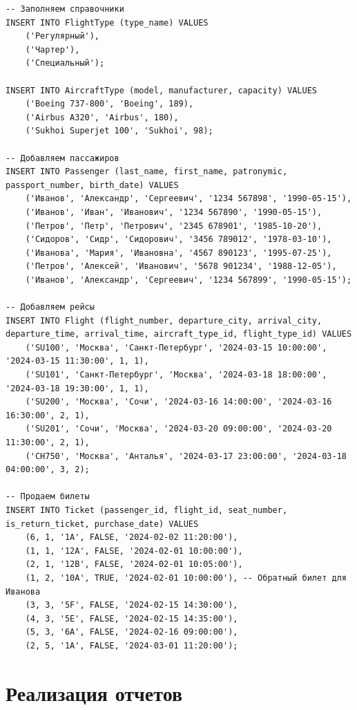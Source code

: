 \documentclass[a4paper,12pt]{article}
\begin{document}
\begin{verbatim}
-- Заполняем справочники
INSERT INTO FlightType (type_name) VALUES 
    ('Регулярный'),
    ('Чартер'),
    ('Специальный');

INSERT INTO AircraftType (model, manufacturer, capacity) VALUES 
    ('Boeing 737-800', 'Boeing', 189),
    ('Airbus A320', 'Airbus', 180),
    ('Sukhoi Superjet 100', 'Sukhoi', 98);

-- Добавляем пассажиров
INSERT INTO Passenger (last_name, first_name, patronymic, passport_number, birth_date) VALUES
	('Иванов', 'Александр', 'Сергеевич', '1234 567898', '1990-05-15'),
    ('Иванов', 'Иван', 'Иванович', '1234 567890', '1990-05-15'),
    ('Петров', 'Петр', 'Петрович', '2345 678901', '1985-10-20'),
    ('Сидоров', 'Сидр', 'Сидорович', '3456 789012', '1978-03-10'),
    ('Иванова', 'Мария', 'Ивановна', '4567 890123', '1995-07-25'),
    ('Петров', 'Алексей', 'Иванович', '5678 901234', '1988-12-05'),
	('Иванов', 'Александр', 'Сергеевич', '1234 567899', '1990-05-15');

-- Добавляем рейсы
INSERT INTO Flight (flight_number, departure_city, arrival_city, departure_time, arrival_time, aircraft_type_id, flight_type_id) VALUES
    ('SU100', 'Москва', 'Санкт-Петербург', '2024-03-15 10:00:00', '2024-03-15 11:30:00', 1, 1),
    ('SU101', 'Санкт-Петербург', 'Москва', '2024-03-18 18:00:00', '2024-03-18 19:30:00', 1, 1),
    ('SU200', 'Москва', 'Сочи', '2024-03-16 14:00:00', '2024-03-16 16:30:00', 2, 1),
    ('SU201', 'Сочи', 'Москва', '2024-03-20 09:00:00', '2024-03-20 11:30:00', 2, 1),
    ('CH750', 'Москва', 'Анталья', '2024-03-17 23:00:00', '2024-03-18 04:00:00', 3, 2);

-- Продаем билеты
INSERT INTO Ticket (passenger_id, flight_id, seat_number, is_return_ticket, purchase_date) VALUES
    (6, 1, '1A', FALSE, '2024-02-02 11:20:00'),
    (1, 1, '12A', FALSE, '2024-02-01 10:00:00'),
    (2, 1, '12B', FALSE, '2024-02-01 10:05:00'),
    (1, 2, '10A', TRUE, '2024-02-01 10:00:00'), -- Обратный билет для Иванова
    (3, 3, '5F', FALSE, '2024-02-15 14:30:00'),
    (4, 3, '5E', FALSE, '2024-02-15 14:35:00'),
    (5, 3, '6A', FALSE, '2024-02-16 09:00:00'),
    (2, 5, '1A', FALSE, '2024-03-01 11:20:00');
\end{verbatim}

\section{Реализация отчетов}
\end{document}
